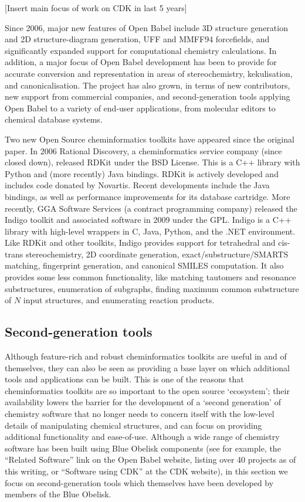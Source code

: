 \documentclass[10pt]{bmc_article}
\newenvironment{bmcformat}{\fussy\setboolean{publ}{true}}{\fussy}
\begin{document}
\begin{bmcformat}
[Insert main focus of work on CDK in last 5 years]

Since 2006, major new features of Open Babel include 3D structure
generation and 2D structure-diagram generation, UFF and MMFF94
forcefields, and significantly expanded support for computational
chemistry calculations. In addition, a major focus of Open Babel development
has been to provide for accurate conversion and representation in
areas of stereochemistry, kekulisation, and canonicalisation. The
project has also grown, in terms of new contributors, new support from
commercial companies, and second-generation tools applying Open Babel
to a variety of end-user applications, from molecular editors to
chemical database systems.

Two new Open Source cheminformatics toolkits have appeared since the
original paper. In 2006 Rational Discovery, a cheminformatics service
company (since closed down), released RDKit \cite{WebRDKit} under the
BSD License. This is a C++ library with Python and (more recently)
Java bindings. RDKit is actively developed and includes
code donated by Novartis. Recent developments include the Java
bindings, as well as performance improvements for its database
cartridge. More recently, GGA Software Services
(a contract programming company)
released the Indigo toolkit \cite{WebIndigo} and associated software
in 2009 under the GPL. Indigo is a C++ library with
high-level wrappers in C, Java, Python, and the .NET
environment. Like RDKit and other toolkits, Indigo provides support for
tetrahedral and cis-trans stereochemistry, 2D coordinate generation,
exact/substructure/SMARTS matching, fingerprint generation, and
canonical SMILES computation.
It also provides some less common functionality, like matching
tautomers and resonance substructures, enumeration of subgraphs,
finding maximum common substructure of $N$ input structures, and
enumerating reaction products.

\subsection*{Second-generation tools}

Although feature-rich and robust cheminformatics toolkits are useful
in and of themselves, they can also be seen as providing a base layer
on which additional tools and applications can be built. This is one
of the reasons that cheminformatics toolkits are so important to the
open source `ecosystem'; their availability lowers the barrier for the
development of a `second generation' of chemistry software that no
longer needs to concern itself with the low-level details of
manipulating chemical structures, and can focus on providing
additional functionality and ease-of-use. Although a wide range of
chemistry software has been built using Blue Obelisk
components (see for example, the ``Related Software'' link on the Open
Babel website,\cite{WebOBRelated} listing over 40 projects as of this writing, 
or ``Software using CDK'' at the CDK website), in this
section we focus on second-generation tools which themselves have been
developed by members of the Blue Obelisk. 


\end{bmcformat}
\end{document}
